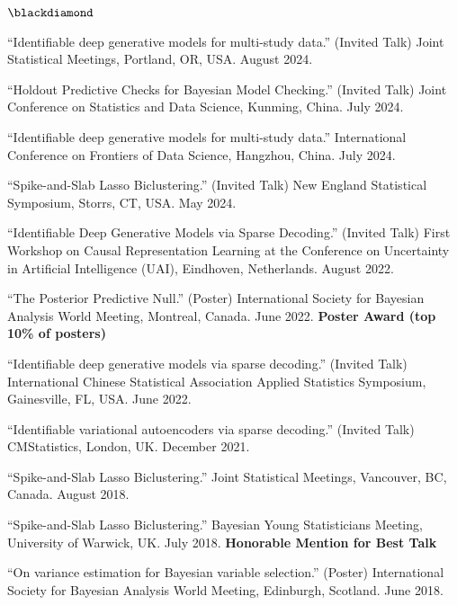 \documentclass[margin,line]{res}
\newenvironment{list2}{
  \begin{list}{\footnotesize$\blackdiamond$}{%
      \setlength{\itemsep}{8pt}
      \setlength{\parsep}{2pt} \setlength{\parskip}{2pt}
      \setlength{\topsep}{2pt} \setlength{\partopsep}{2pt} 
      \setlength{\leftmargin}{0.2in}
      }}{\end{list}}
\begin{document}
\begin{resume}
\begin{list2}
\item ``Identifiable deep generative models for multi-study data.'' (Invited Talk) Joint Statistical Meetings, Portland, OR, USA. August 2024. 

\item ``Holdout Predictive Checks for Bayesian Model Checking.'' (Invited Talk) Joint Conference on Statistics and Data Science, Kunming, China. July 2024.

\item ``Identifiable deep generative models for multi-study data.'' International Conference on Frontiers of Data Science, Hangzhou, China. July 2024.

\item ``Spike-and-Slab Lasso Biclustering.'' (Invited Talk) New England Statistical Symposium, Storrs, CT, USA. May 2024.

\item ``Identifiable Deep Generative Models via Sparse Decoding.'' (Invited Talk) First Workshop on Causal Representation Learning at the Conference on Uncertainty in Artificial Intelligence (UAI), Eindhoven, Netherlands. August 2022. 

\item ``The Posterior Predictive Null.'' (Poster) International Society for Bayesian Analysis World Meeting, Montreal, Canada. June 2022. {\bf Poster Award (top 10\% of posters)}

\item ``Identifiable deep generative models via sparse decoding.'' (Invited Talk) International Chinese Statistical Association Applied Statistics Symposium, Gainesville, FL, USA. June 2022.

\item ``Identifiable variational autoencoders via sparse decoding.'' (Invited Talk) CMStatistics, London, UK. December 2021.

\item ``Spike-and-Slab Lasso Biclustering.'' Joint Statistical Meetings, Vancouver, BC, Canada. August 2018.

\item ``Spike-and-Slab Lasso Biclustering.'' Bayesian Young Statisticians Meeting, University of Warwick, UK. July 2018. {\bf Honorable Mention for Best Talk}

\item ``On variance estimation for Bayesian variable selection.'' (Poster) International Society for Bayesian Analysis World Meeting, Edinburgh, Scotland. June 2018. 


\end{list2}
\end{resume}
\end{document}
